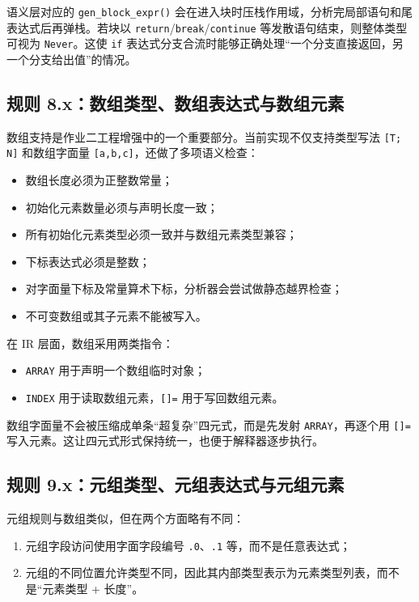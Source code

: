 \documentclass[UTF8,a4paper,12pt]{ctexart}
\newcommand{\pkg}[1]{\texttt{#1}}
\newcommand{\op}[1]{\texttt{#1}}
\begin{document}
语义层对应的 \pkg{gen\_block\_expr()} 会在进入块时压栈作用域，分析完局部语句和尾表达式后再弹栈。若块以 \pkg{return}/\pkg{break}/\pkg{continue} 等发散语句结束，则整体类型可视为 \pkg{Never}。这使 \pkg{if} 表达式分支合流时能够正确处理“一个分支直接返回，另一个分支给出值”的情况。

\subsection{规则 8.x：数组类型、数组表达式与数组元素}

数组支持是作业二工程增强中的一个重要部分。当前实现不仅支持类型写法 \pkg{[T; N]} 和数组字面量 \pkg{[a,b,c]}，还做了多项语义检查：

\begin{itemize}
    \item 数组长度必须为正整数常量；
    \item 初始化元素数量必须与声明长度一致；
    \item 所有初始化元素类型必须一致并与数组元素类型兼容；
    \item 下标表达式必须是整数；
    \item 对字面量下标及常量算术下标，分析器会尝试做静态越界检查；
    \item 不可变数组或其子元素不能被写入。
\end{itemize}

在 IR 层面，数组采用两类指令：

\begin{itemize}
    \item \op{ARRAY} 用于声明一个数组临时对象；
    \item \op{INDEX} 用于读取数组元素，\op{[]=} 用于写回数组元素。
\end{itemize}

数组字面量不会被压缩成单条“超复杂”四元式，而是先发射 \op{ARRAY}，再逐个用 \op{[]=} 写入元素。这让四元式形式保持统一，也便于解释器逐步执行。

\subsection{规则 9.x：元组类型、元组表达式与元组元素}

元组规则与数组类似，但在两个方面略有不同：

\begin{enumerate}[label=\arabic*.]
    \item 元组字段访问使用字面字段编号 \pkg{.0}、\pkg{.1} 等，而不是任意表达式；
    \item 元组的不同位置允许类型不同，因此其内部类型表示为元素类型列表，而不是“元素类型 + 长度”。
\end{enumerate}
\end{document}
